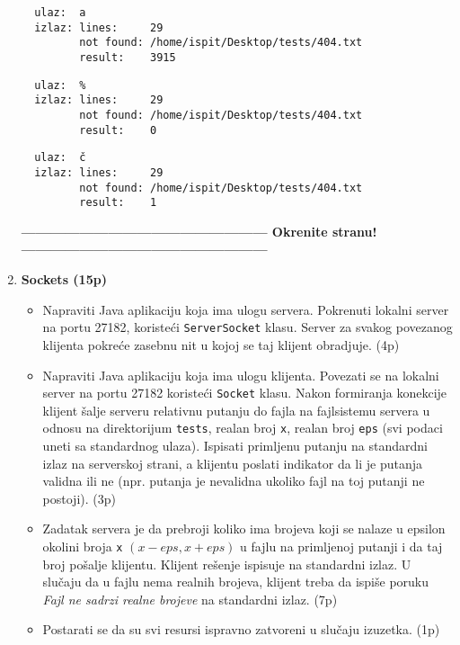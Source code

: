 \documentclass[]{article}
\begin{document}
\begin{enumerate}
  \noindent
  \begin{lstlisting}
  ulaz:  a
  izlaz: lines:     29
         not found: /home/ispit/Desktop/tests/404.txt
         result:    3915
  \end{lstlisting}
  \begin{lstlisting}
  ulaz:  %
  izlaz: lines:     29
         not found: /home/ispit/Desktop/tests/404.txt
         result:    0
  \end{lstlisting}
  \begin{lstlisting}
  ulaz:  č
  izlaz: lines:     29
         not found: /home/ispit/Desktop/tests/404.txt
         result:    1
  \end{lstlisting}
\begin{center}
  \vspace{10pt}
  \textbf{--------------------------------------------------- Okrenite stranu! ---------------------------------------------------}
\end{center}
\newpage
  \item \textbf{Sockets (15p)}
  \\
  \begin{itemize}
    \item Napraviti Java aplikaciju koja ima ulogu servera. Pokrenuti lokalni server na portu 27182, koristeći \texttt{ServerSocket} klasu. Server za svakog povezanog klijenta pokreće zasebnu nit u kojoj se taj klijent obradjuje. \hfill (4p)
    \item Napraviti Java aplikaciju koja ima ulogu klijenta. Povezati se na lokalni server na portu 27182 koristeći \texttt{Socket} klasu. Nakon formiranja konekcije klijent šalje serveru relativnu putanju do fajla na fajlsistemu servera u odnosu na direktorijum \texttt{tests}, realan broj \texttt{x}, realan broj \texttt{eps} (svi podaci uneti sa standardnog ulaza). Ispisati primljenu putanju na standardni izlaz na serverskoj strani, a klijentu poslati indikator da li je putanja validna ili ne (npr. putanja je nevalidna ukoliko fajl na toj putanji ne postoji). \hfill (3p)
    \item Zadatak servera je da prebroji koliko ima brojeva koji se nalaze u epsilon okolini broja \texttt{x} $(\textit{x}-\textit{eps}, \textit{x}+\textit{eps})$ u fajlu na primljenoj putanji i da taj broj pošalje klijentu. Klijent rešenje ispisuje na standardni izlaz. U slučaju da u fajlu nema realnih brojeva, klijent treba da ispiše poruku \textit{Fajl ne sadrzi realne brojeve} na standardni izlaz. \hfill (7p)
    \item Postarati se da su svi resursi ispravno zatvoreni u slučaju izuzetka. \hfill (1p)
  \end{itemize}


\end{enumerate}
\end{document}
